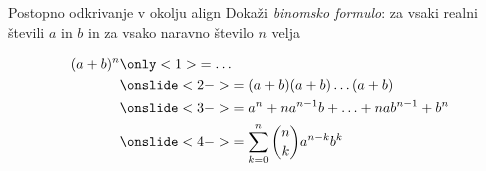 \begin{frame}{Postopno odkrivanje v okolju align}
	Dokaži \emph{binomsko formulo}: za vsaki realni števili \(a\) in \(b\) in za vsako naravno število \(n\) velja
	

\begin{align*}
(a+b)^n
&\only<1>{= \ldots}\\
&\onslide<2->{= (a+b)(a+b)\dots(a+b)}\\
&\onslide<3->{= a^n+n a^{n-1}b+\ldots+n ab^{n-1}+b^n}\\
&\onslide<4->{= \sum_{k=0}^{n}\binom{n}{k}a^{n-k}b^k}
\end{align*}


\end{frame}
